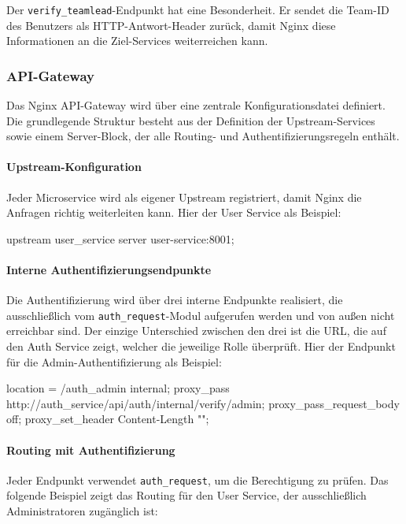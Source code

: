 Der \texttt{verify\_teamlead}-Endpunkt hat eine Besonderheit.
Er sendet die Team-ID des Benutzers als HTTP-Antwort-Header zurück, 
damit Nginx diese Informationen an die Ziel-Services weiterreichen kann.

\subsubsection{API-Gateway}
\label{sec:impl_nginx}

Das Nginx \gls{API}-Gateway wird über eine zentrale Konfigurationsdatei 
definiert. Die grundlegende Struktur besteht aus der Definition 
der Upstream-Services sowie einem Server-Block, der alle 
Routing- und Authentifizierungsregeln enthält.

\paragraph{Upstream-Konfiguration}

Jeder Microservice wird als eigener Upstream registriert, 
damit Nginx die Anfragen richtig weiterleiten kann. Hier der User Service als Beispiel:
\begin{CodeBox}[language=bash, caption={Upstream-Definition der Microservices}]
upstream user_service {server user-service:8001;}
\end{CodeBox}

\newpage

\paragraph{Interne Authentifizierungsendpunkte}
Die Authentifizierung wird über drei interne Endpunkte realisiert, 
die ausschließlich vom \texttt{auth\_request}-Modul aufgerufen 
werden und von außen nicht erreichbar sind. Der einzige Unterschied zwischen den drei 
ist die URL, die auf den Auth Service zeigt, welcher die jeweilige Rolle überprüft.
Hier der Endpunkt für die Admin-Authentifizierung als Beispiel:
\begin{CodeBox}[language=bash]
location = /auth_admin {
    internal;
    proxy_pass http://auth_service/api/auth/internal/verify/admin;
    proxy_pass_request_body off;
    proxy_set_header Content-Length "";
}
\end{CodeBox}

\paragraph{Routing mit Authentifizierung}
Jeder Endpunkt verwendet \texttt{auth\_request}, um die Berechtigung zu prüfen. Das folgende 
Beispiel zeigt das Routing für den User Service, der ausschließlich 
Administratoren zugänglich ist:

